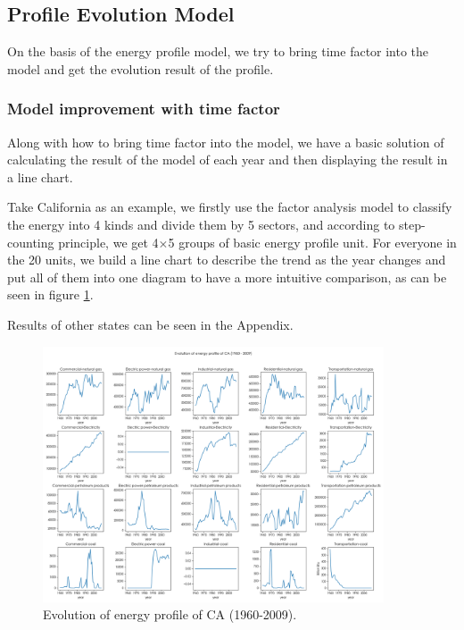 \documentclass[a4paper,11pt]{article}
\begin{document}
\subsection{Profile Evolution Model}
\par On the basis of the energy profile model, we try to bring time factor into the model and get the evolution result of the profile. 

\subsubsection{Model improvement with time factor}
\par Along with how to bring time factor into the model, we have a basic solution of calculating the result of the model of each year and then displaying the result in a line chart. 

\par Take California as an example, we firstly use the factor analysis model to classify the energy into 4 kinds and divide them by 5 sectors, and according to step-counting principle, we get 4$\times$5 groups of basic energy profile unit. For everyone in the 20 units, we build a line chart to describe the trend as the year changes and put all of them into one diagram to have a more intuitive comparison, as can be seen in figure \ref{fig:part-2-CA}.  
\par Results of other states can be seen in the Appendix. %

\begin{figure}[H]%
    \centering 
    \includegraphics[width=0.9\textwidth]{./Pic/part-2-CA.png}
    \caption{Evolution of energy profile of CA (1960-2009).}
    \label{fig:part-2-CA}  
\end{figure}
\end{document}
